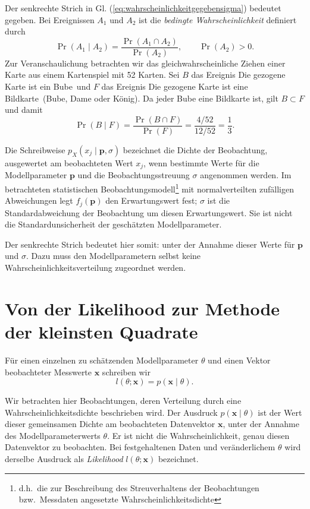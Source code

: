 Der senkrechte Strich in Gl. (\ref{eq:wahrscheinlichkeitgegebensigma}) bedeutet \glqq gegeben\grqq. Bei Ereignissen
$A_1$ und $A_2$ ist die \textsl{bedingte Wahrscheinlichkeit} definiert durch
\begin{equation}
\Pr(A_1\mid A_2)=\frac{\Pr(A_1\cap A_2)}{\Pr(A_2)},
\qquad \Pr(A_2)>0.
\end{equation}
Zur Veranschaulichung betrachten wir das gleichwahrscheinliche Ziehen
einer Karte aus einem Kartenspiel mit 52 Karten. Sei $B$ das Ereignis
\glqq Die gezogene Karte ist ein Bube\grqq\ und $F$ das Ereignis
\glqq Die gezogene Karte ist eine Bildkarte\grqq\ (Bube, Dame oder König).
Da jeder Bube eine Bildkarte ist, gilt $B\subset F$ und damit
\begin{equation}
\Pr(B\mid F)=\frac{\Pr(B\cap F)}{\Pr(F)}
=\frac{4/52}{12/52}=\frac{1}{3}.
\end{equation}

Die Schreibweise $p_X(x_j\mid\mathbf p,\sigma)$ bezeichnet die
Dichte der Beobachtung, ausgewertet am beobachteten Wert $x_j$,
wenn bestimmte Werte für die Modellparameter $\mathbf p$ und
die Beobachtungsstreuung $\sigma$ angenommen werden.
Im betrachteten statistischen Beobachtungsmodell\footnote{d.h.\ die zur Beschreibung des Streuverhaltens der Beobachtungen bzw.\ Messdaten angesetzte Wahrscheinlichkeitsdichte} mit normalverteilten zufälligen Abweichungen legt $f_j(\mathbf p)$ den
Erwartungswert fest; $\sigma$ ist die Standardabweichung der
Beobachtung um diesen Erwartungswert. Sie ist nicht die
Standardunsicherheit der geschätzten Modellparameter.

Der senkrechte Strich bedeutet hier somit:
\glqq unter der Annahme dieser Werte für $\mathbf p$ und $\sigma$\grqq.
Dazu muss den Modellparametern selbst keine
Wahrscheinlichkeitsverteilung zugeordnet werden.

\section{Von der Likelihood zur Methode der kleinsten Quadrate}
\label{V4Likelihood}

Für einen einzelnen zu schätzenden Modellparameter $\theta$ und einen Vektor
beobachteter Messwerte $\mathbf x$ schreiben wir
\begin{equation}
l(\theta;\mathbf x)=p(\mathbf x\mid\theta).
\label{likelihoodvsWahrschdichte}
\end{equation}

Wir betrachten hier Beobachtungen, deren Verteilung durch eine
Wahrscheinlichkeitsdichte beschrieben wird.
Der Ausdruck $p(\mathbf x\mid\theta)$ ist der Wert dieser gemeinsamen
Dichte am beobachteten Datenvektor $\mathbf x$, unter der Annahme
des Modellparameterwerts $\theta$. Er ist nicht die Wahrscheinlichkeit,
genau diesen Datenvektor zu beobachten.
Bei festgehaltenen Daten und veränderlichem $\theta$ wird derselbe
Ausdruck als \textsl{Likelihood} $l(\theta;\mathbf x)$ bezeichnet.

